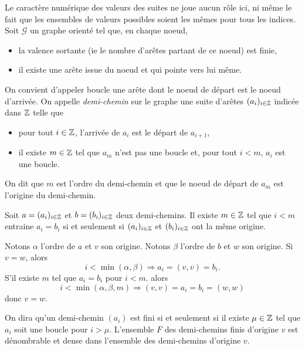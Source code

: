 \noindent Le caractère numérique des valeurs des suites ne joue aucun rôle ici, ni même le fait que les ensembles de valeurs possibles soient les mêmes pour tous les indices.
Soit $\mathcal{G}$ un graphe orienté tel que, en chaque noeud,
\begin{itemize}
 \item la valence sortante (ie le nombre d'arêtes partant de ce noeud) est finie,
 \item il existe une arête issue du noeud et qui pointe vers lui même.
\end{itemize}
On convient d'appeler boucle une arête dont le noeud de départ est le noeud d'arrivée.\newline
On appelle \emph{demi-chemin} sur le graphe une suite d'arêtes $(a_i)_{i\in\mathbb{Z}}$ indicée dans $\mathbb{Z}$ telle que
\begin{itemize}
 \item pour tout $i\in \mathbb{Z}$, l'arrivée de $a_i$ est le départ de $a_{i+1}$,
 \item il existe $m\in\mathbb{Z}$ tel que $a_m$ n'est pas une boucle et, pour tout $i<m$, $a_i$ est une boucle.
\end{itemize}
On dit que $m$ est l'ordre du demi-chemin et que le noeud de départ de $a_m$ est l'origine du demi-chemin.
\begin{prop}
 Soit $a=(a_i)_{i\in \mathbb{Z}}$ et $b=(b_i)_{i\in \mathbb{Z}}$ deux demi-chemins. Il existe $m\in \mathbb{Z}$ tel que $i<m$ entraine $a_i=b_i$ si et seulement si $(a_i)_{i\in \mathbb{Z}}$ et $(b_i)_{i\in \mathbb{Z}}$ ont la même origine.
\end{prop}
\begin{demo}
 Notons $\alpha$ l'ordre de $a$ et $v$ son origine. Notons $\beta$ l'ordre de $b$ et $w$ son origine.\newline
 Si $v=w$, alors
 \begin{displaymath}
  i < \min(\alpha, \beta) \Rightarrow a_i = (v,v) = b_i.
 \end{displaymath}
S'il existe $m$ tel que $a_i=b_i$ pour $i<m$. alors
\begin{displaymath}
 i < \min(\alpha, \beta, m) \Rightarrow (v,v) = a_i = b_i = (w,w)
\end{displaymath}
donc $v = w$.
\end{demo}

On dira qu'un demi-chemin $(a_i)$ est fini si et seulement si il existe $\mu \in \mathbb{Z}$ tel que $a_i$ soit une boucle pour $i>\mu$. L'ensemble $F$ des demi-chemins finis d'origine $v$ est dénombrable et dense dans l'ensemble des demi-chemins d'origine $v$.

